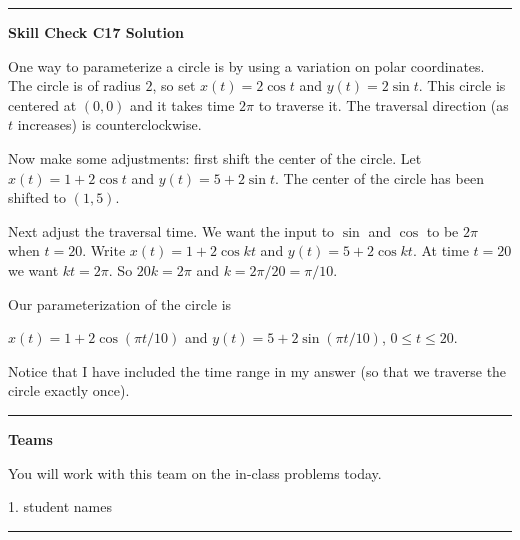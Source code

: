 \documentclass[12pt,letterpaper,noanswers]{exam}
\begin{document}
\vspace{0.2cm}
\hrule
\vspace{0.2cm}

\noindent\textbf{Skill Check C17 Solution}

One way to parameterize a circle is by using a variation on polar coordinates.  The circle is of radius $2$, so set $x(t) = 2\cos t$ and $y(t) = 2\sin t$.  This circle is centered at $(0,0)$ and it takes time $2\pi$ to traverse it.  The traversal direction (as $t$ increases) is counterclockwise.

Now make some adjustments: first shift the center of the circle.  Let $x(t) = 1+2\cos t$ and $y(t) = 5 + 2\sin t$.  The center of the circle has been shifted to $(1,5)$.

Next adjust the traversal time.  We want the input to $\sin$ and $\cos$ to be $2\pi$ when $t = 20$.  Write $x(t) = 1+2\cos kt$ and $y(t) = 5+2\cos kt$.  At time $t=20$ we want $kt = 2\pi$.  So $20k = 2\pi$ and $k = 2\pi/20 = \pi/10$.

Our parameterization of the circle is

$x(t) = 1+2\cos(\pi t/10)$ and $y(t)=5+2\sin(\pi t/10)$, $0\leq t\leq 20$.

Notice that I have included the time range in my answer (so that we traverse the circle exactly once).

\vspace{0.2cm}
\hrule
\vspace{0.2cm}

\noindent\textbf{Teams}

You will work with this team on the in-class problems today.
\begin{multicols}{2}
1.  student names

\end{multicols}

\hrule
\vspace{0.2cm}
\end{document}
